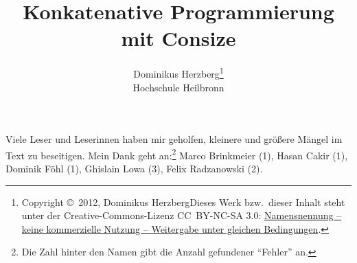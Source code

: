 \documentclass[a4paper]{refrep}
\theoremstyle{plain}
\begin{document}
\title{\bf Konkatenative Programmierung mit Consize}
\author{Dominikus Herzberg\thanks{%
Copyright \copyright\ 2012, Dominikus Herzberg\medskip\newline Dieses Werk bzw.\ dieser Inhalt steht unter der Creative-Commons-Lizenz CC~BY-NC-SA 3.0: \href{http://creativecommons.org/licenses/by-nc-sa/3.0/deed.de}{Namensnennung -- keine kommerzielle Nutzung -- Weitergabe unter gleichen Bedingungen}.}%
\\Hochschule Heilbronn}
\maketitle

Viele Leser und Leserinnen haben mir geholfen, kleinere und größere Mängel im Text zu beseitigen. Mein Dank geht an:\footnote{Die Zahl hinter den Namen gibt die Anzahl gefundener "`Fehler"' an.}
Marco Brinkmeier (1),
Hasan Cakir (1),
Dominik Föhl (1),
Ghislain Lowa (3),
Felix Radzanowski (2). 

\newpage

\tableofcontents











\appendix



%
%
\end{document}
